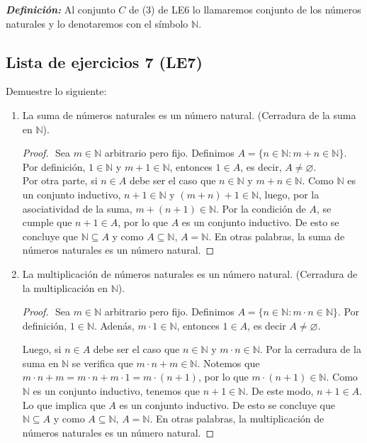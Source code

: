 \documentclass[11pt]{article}
\newcommand{\N}{\mathbb{N}}
\newcommand{\bfit}[1]{\textbf{\textit{#1}}}
\let\emptyset\varnothing
\begin{document}
\bfit{Definición:}  Al conjunto $C$ de (3) de LE6 lo llamaremos conjunto de los números naturales y lo denotaremos con el símbolo $\N$.

\subsection*{Lista de ejercicios 7 (LE7)}

Demuestre lo siguiente:

\begin{enumerate}[label=\alph*)]
    \item La suma de números naturales es un número natural. (Cerradura de la suma en $\N$).
    \vspace{-1em}\begin{proof}$ $\newline
        Sea $m\in \N$ arbitrario pero fijo. Definimos $A=\{ n\in \N : m+n \in \N \}$. Por definición, $1\in \N$ y $m+1\in \N$, entonces $1\in A$, es decir, $A\neq \emptyset$. \\[5pt] Por otra parte, si $n\in A$ debe ser el caso que $n\in \N$ y $m+n\in \N$. Como $\N$ es un conjunto inductivo, $n+1 \in \N$ y $(m+n)+1 \in \N$, luego, por la asociatividad de la suma, $m+(n+1)\in \N$. Por la condición de $A$, se cumple que $n+1\in A$, por lo que $A$ es un conjunto inductivo. De esto se concluye que $\N\subseteq A$ y como $A\subseteq \N$, $A=\N$. En otras palabras, la suma de números naturales es un número natural.    
    \end{proof} \vspace{-1em}

    \item La multiplicación de números naturales es un número natural. (Cerradura de la multiplicación en $\N$).
    \vspace{-1em}\begin{proof}$ $\newline
        Sea $m\in \N$ arbitrario pero fijo. Definimos $A=\{n\in \N: m\cdot n \in \N\}$. Por definición, $1 \in \N$. Adenás, $m\cdot 1 \in \N$, entonces $1 \in A$, es decir $A \neq \emptyset$.
    
        Luego, si $n \in A$ debe ser el caso que $n\in \N$ y $m \cdot n \in \N$. Por la cerradura de la suma en $\N$ se verifica que $m\cdot n + m \in \N$. Notemos que $m\cdot n + m=m\cdot n + m\cdot 1 = m\cdot (n+1)$, por lo que $m \cdot (n+1) \in \N$. Como $\N$ es un conjunto inductivo, tenemos que $n+1\in \N$. De este modo, $n+1\in A$. Lo que implica que $A$ es un conjunto inductivo. De esto se concluye que $\N \subseteq A$ y como $A\subseteq \N$, $A=\N$. En otras palabras, la multiplicación de números naturales es un número natural.
    \end{proof} \vspace{-1em}


\end{enumerate}
\end{document}
